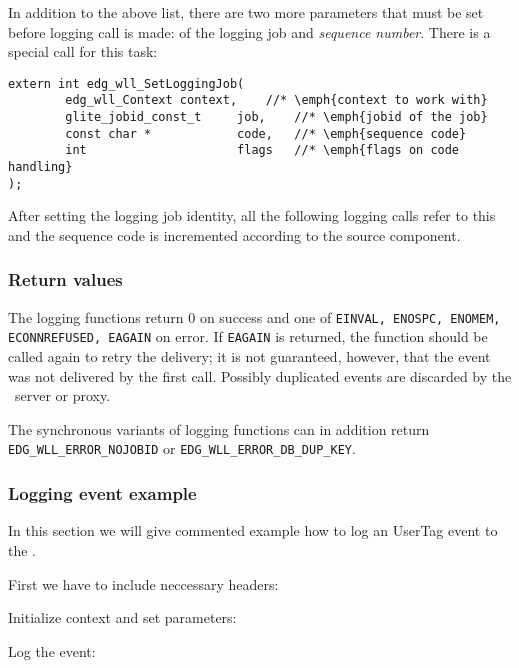 %
In addition to the above list, there are two more parameters that must
be set before logging call is made: \jobid of the logging job and
\emph{sequence number}. There is a special call for this task:
\begin{lstlisting}
extern int edg_wll_SetLoggingJob(
        edg_wll_Context context,	//* \emph{context to work with}
        glite_jobid_const_t     job,	//* \emph{jobid of the job}
        const char *            code,	//* \emph{sequence code}
        int                     flags	//* \emph{flags on code handling}
);
\end{lstlisting}
After setting the logging job identity, all the following logging
calls refer to this \jobid and the sequence code is incremented
according to the source component.

\subsubsection{Return values}
The logging functions return 0 on success and one of \texttt{EINVAL,
ENOSPC, ENOMEM, ECONNREFUSED, EAGAIN} on error. If \texttt{EAGAIN} is
returned, the function should be called again to retry the delivery;
it is not guaranteed, however, that the event was not delivered by the
first call. Possibly duplicated events are discarded by the \LB\
server or proxy.

The synchronous variants of logging functions can in addition return
\verb'EDG_WLL_ERROR_NOJOBID' or \verb'EDG_WLL_ERROR_DB_DUP_KEY'.

\subsubsection{Logging event example}
In this section we will give commented example how to log an UserTag event to
the \LB.

First we have to include neccessary headers:


Initialize context and set parameters:




Log the event:


